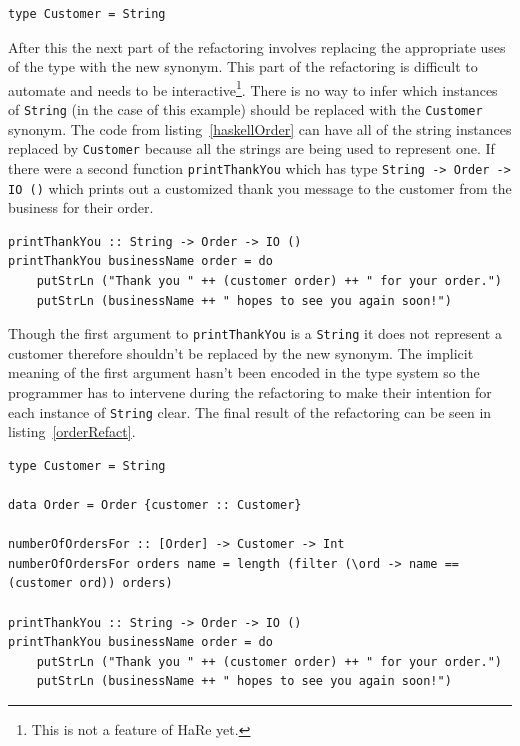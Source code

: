 \begin{lstlisting}[caption={The customer synonym}]
type Customer = String
\end{lstlisting}

After this the next part of the refactoring involves replacing the appropriate uses of the type with the new synonym. This part of the refactoring is difficult to automate and needs to be interactive\footnote{This is not a feature of HaRe yet.}. There is no way to infer which instances of \texttt{String} (in the case of this example) should be replaced with the \texttt{Customer} synonym. The code from listing~\ref{haskellOrder} can have all of the string instances replaced by \texttt{Customer} because all the strings are being used to represent one. If there were a second function \texttt{printThankYou} which has type \texttt{String -> Order -> IO ()} which prints out a customized thank you message to the customer from the business for their order. 

\begin{lstlisting}[caption={The printThankYou function}]
printThankYou :: String -> Order -> IO ()
printThankYou businessName order = do
	putStrLn ("Thank you " ++ (customer order) ++ " for your order.")
	putStrLn (businessName ++ " hopes to see you again soon!")
\end{lstlisting}

Though the first argument to \texttt{printThankYou} is a \texttt{String} it does not represent a customer therefore shouldn't be replaced by the new synonym. The implicit meaning of the first argument hasn't been encoded in the type system so the programmer has to intervene during the refactoring to make their intention for each instance of \texttt{String} clear. The final result of the refactoring can be seen in listing~\ref{orderRefact}. 

\begin{lstlisting}[label=orderRefact,caption={The final result after adding a synonym for String.}]
type Customer = String

data Order = Order {customer :: Customer}

numberOfOrdersFor :: [Order] -> Customer -> Int
numberOfOrdersFor orders name = length (filter (\ord -> name == (customer ord)) orders)

printThankYou :: String -> Order -> IO ()
printThankYou businessName order = do
	putStrLn ("Thank you " ++ (customer order) ++ " for your order.")
	putStrLn (businessName ++ " hopes to see you again soon!")
\end{lstlisting}

